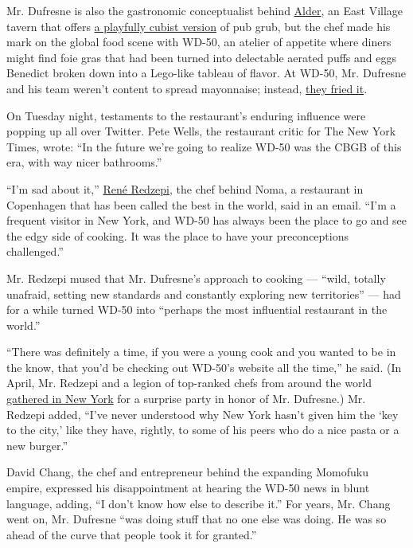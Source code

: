Mr. Dufresne is also the gastronomic conceptualist behind
\href{http://www.nytimes3xbfgragh.onion/2013/07/10/dining/reviews/restaurant-review-alder-in-the-east-village.html}{Alder},
an East Village tavern that offers
\href{http://www.nytimes3xbfgragh.onion/2013/02/06/dining/wylie-dufresne-prepares-you-for-a-cubist-spin-on-pub-grub.html}{a
playfully cubist version} of pub grub, but the chef made his mark on the
global food scene with WD-50, an atelier of appetite where diners might
find foie gras that had been turned into delectable aerated puffs and
eggs Benedict broken down into a Lego-like tableau of flavor. At WD-50,
Mr. Dufresne and his team weren't content to spread mayonnaise; instead,
\href{http://www.esquire.com/features/food-drink/ESQ0305EATSCHEF_142}{they
fried it}.

On Tuesday night, testaments to the restaurant's enduring influence were
popping up all over Twitter. Pete Wells, the restaurant critic for The
New York Times, wrote: ``In the future we're going to realize WD-50 was
the CBGB of this era, with way nicer bathrooms.''

``I'm sad about it,''
\href{http://www.nytimes3xbfgragh.onion/2010/07/07/dining/07chef.html?pagewanted=all}{René
Redzepi}, the chef behind Noma, a restaurant in Copenhagen that has been
called the best in the world, said in an email. ``I'm a frequent visitor
in New York, and WD-50 has always been the place to go and see the edgy
side of cooking. It was the place to have your preconceptions
challenged.''

Mr. Redzepi mused that Mr. Dufresne's approach to cooking --- ``wild,
totally unafraid, setting new standards and constantly exploring new
territories'' --- had for a while turned WD-50 into ``perhaps the most
influential restaurant in the world.''

``There was definitely a time, if you were a young cook and you wanted
to be in the know, that you'd be checking out WD-50's website all the
time,'' he said. (In April, Mr. Redzepi and a legion of top-ranked chefs
from around the world
\href{http://www.newyorker.com/online/blogs/culture/2014/04/operation-surprise-wylie.html}{gathered
in New York} for a surprise party in honor of Mr. Dufresne.) Mr. Redzepi
added, ``I've never understood why New York hasn't given him the `key to
the city,' like they have, rightly, to some of his peers who do a nice
pasta or a new burger.''

David Chang, the chef and entrepreneur behind the expanding Momofuku
empire, expressed his disappointment at hearing the WD-50 news in blunt
language, adding, ``I don't know how else to describe it.'' For years,
Mr. Chang went on, Mr. Dufresne ``was doing stuff that no one else was
doing. He was so ahead of the curve that people took it for granted.''

